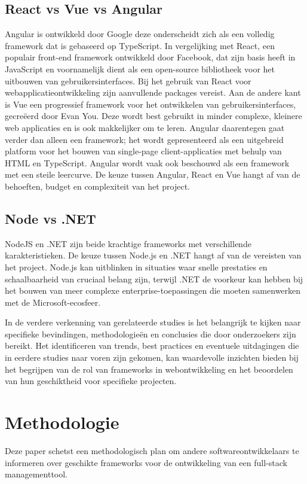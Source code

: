 \documentclass{hogent-article}
\begin{document}
\subsection{React vs Vue vs Angular}%
Angular is ontwikkeld door Google deze onderscheidt zich als een volledig framework dat is gebaseerd op TypeScript. In vergelijking met React, een populair front-end framework ontwikkeld door Facebook, dat zijn basis heeft in JavaScript en voornamelijk dient als een open-source bibliotheek voor het uitbouwen van gebruikersinterfaces. Bij het gebruik van React voor webapplicatieontwikkeling zijn aanvullende packages vereist. Aan de andere kant is Vue een progressief framework voor het ontwikkelen van gebruikersinterfaces, gecreëerd door Evan You. Deze wordt best gebruikt in minder complexe, kleinere web applicaties en is ook makkelijker om te leren. Angular daarentegen gaat verder dan alleen een framework; het wordt gepresenteerd als een uitgebreid platform voor het bouwen van single-page client-applicaties met behulp van HTML en TypeScript. Angular wordt vaak ook beschouwd als een framework met een steile leercurve. De keuze tussen Angular, React en Vue hangt af van de behoeften, budget en complexiteit van het project.
\autocite{Joshi2023}

\subsection{Node vs .NET}%
NodeJS en .NET zijn beide krachtige frameworks met verschillende karakteristieken. De keuze tussen Node.js en .NET hangt af van de vereisten van het project. Node.js kan uitblinken in situaties waar snelle prestaties en schaalbaarheid van cruciaal belang zijn, terwijl .NET de voorkeur kan hebben bij het bouwen van meer complexe enterprise-toepassingen die moeten samenwerken met de Microsoft-ecosfeer.
\autocite{Hutsulyak2023}


\bigbreak
In de verdere verkenning van ge\-rel\-a\-teer\-de studies is het belangrijk te kijken naar specifieke bevindingen, methodologieën en conclusies die door onderzoekers zijn bereikt. Het identificeren van trends, best practices en e\-ven\-tu\-ele uitdagingen die in eerdere studies naar voren zijn gekomen, kan waardevolle inzichten bieden bij het begrijpen van de rol van frameworks in webontwikkeling en het beoordelen van hun geschiktheid voor specifieke projecten.




\section{Methodologie}
Deze paper schetst een methodologisch plan om andere softwareontwikkelaars te informeren over geschikte frameworks voor de ontwikkeling van een full-stack managementtool.
\end{document}
